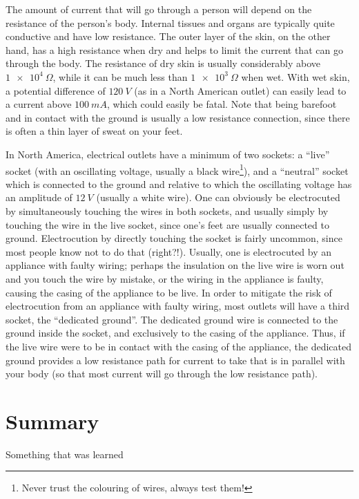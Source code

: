 The amount of current that will go through a person will depend on the resistance of the person's body. Internal tissues and organs are typically quite conductive and have low resistance. The outer layer of the skin, on the other hand, has a high resistance when dry and helps to limit the current that can go through the body. The resistance of dry skin is usually considerably above $\SI{1e4}{\Omega}$, while it can be much less than $\SI{1e3}{\Omega}$ when wet. With wet skin, a potential difference of $\SI{120}{V}$ (as in a North American outlet) can easily lead to a current above $\SI{100}{mA}$, which could easily be fatal. Note that being barefoot and in contact with the ground is usually a low resistance connection, since there is often a thin layer of sweat on your feet.

In North America, electrical outlets have a minimum of two sockets: a ``live'' socket (with an oscillating voltage, usually a black wire\footnote{Never trust the colouring of wires, always test them!}), and a ``neutral'' socket which is connected to the ground and relative to which the oscillating voltage has an amplitude of $\SI{12}{V}$ (usually a white wire). One can obviously be electrocuted by simultaneously touching the wires in both sockets, and usually simply by touching the wire in the live socket, since one's feet are usually connected to ground. Electrocution by directly touching the socket is fairly uncommon, since most people know not to do that (right?!). Usually, one is electrocuted by an appliance with faulty wiring; perhaps the insulation on the live wire is worn out and you touch the wire by mistake, or the wiring in the appliance is faulty, causing the casing of the appliance to be live. In order to mitigate the risk of electrocution from an appliance with faulty wiring, most outlets will have a third socket, the ``dedicated ground''. The dedicated ground wire is connected to the ground inside the socket, and exclusively to the casing of the appliance. Thus, if the live wire were to be in contact with the casing of the appliance, the dedicated ground provides a low resistance path for current to take that is in parallel with your body (so that most current will go through the low resistance path). 


\newpage
\section{Summary}

\begin{chapterSummary}
 Something that was learned
\end{chapterSummary}

